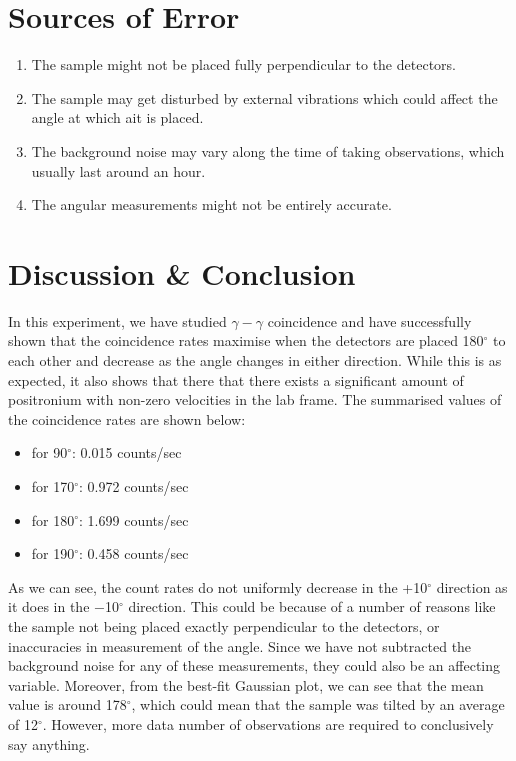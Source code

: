 \section{Sources of Error}

\begin{enumerate}
    \item The sample might not be placed fully perpendicular to the detectors.
    \item The sample may get disturbed by external vibrations which could affect the angle at which ait is placed.
    \item The background noise may vary along the time of taking observations, which usually last around an hour.
    \item The angular measurements might not be entirely accurate.
\end{enumerate}

\section{Discussion \& Conclusion}

In this experiment, we have studied $\gamma-\gamma$ coincidence and have successfully shown that the coincidence rates maximise when the detectors are placed 180$^\circ$ to each other and decrease as the angle changes in either direction. While this is as expected, it also shows that there that there exists a significant amount of positronium with non-zero velocities in the lab frame. The summarised values of the coincidence rates are shown below:

\begin{itemize}
    \item for 90$^\circ$: 0.015 counts/sec
    \item for 170$^\circ$: 0.972 counts/sec
    \item for 180$^\circ$: 1.699 counts/sec
    \item for 190$^\circ$: 0.458 counts/sec\\
\end{itemize}

As we can see, the count rates do not uniformly decrease in the +10$^\circ$ direction as it does in the $-$10$^\circ$ direction. This could be because of a number of reasons like the sample not being placed exactly perpendicular to the detectors, or inaccuracies in measurement of the angle. Since we have not subtracted the background noise for any of these measurements, they could also be an affecting variable. Moreover, from the best-fit Gaussian plot, we can see that the mean value is around 178$^\circ$, which could mean that the sample was tilted by an average of 12$^\circ$. However, more data number of observations are required to conclusively say anything.


